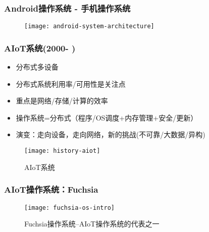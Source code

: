 \begin{frame}[plain]
    \frametitle{Android操作系统 - 手机操作系统}
    
    \begin{figure}
        \centering
        \texttt{[image: android-system-architecture]}
    \end{figure}
    
\end{frame}

\begin{frame}[plain]
	
	\frametitle{AIoT系统(2000- )}
	
	

	\begin{itemize}
		\item 分布式多设备
		\item 分布式系统利用率/可用性是关注点	
		\item 重点是网络/存储/计算的效率
		\item 操作系统=分布式（程序/OS调度+内存管理+安全/更新）
		\item 演变：走向设备，走向网络，新的挑战(不可靠/大数据/异构)
	\end{itemize}
	
	\begin{figure}
		\centering
		\texttt{[image: history-aiot]}
		\caption{AIoT系统}
	\end{figure}
	
\end{frame}

\begin{frame}[plain]
    \frametitle{AIoT操作系统：Fuchsia}
    
    \begin{figure}
        \centering
        \texttt{[image: fuchsia-os-intro]}
        \caption{Fuchsia操作系统--AIoT操作系统的代表之一}
    \end{figure}
    
\end{frame}




